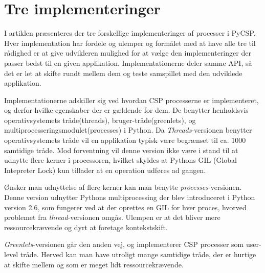 \section{Tre implementeringer}
I artiklen \cite{Friborg2009} præsenteres der tre forskellige implementeringer af processer i PyCSP. Hver implementation har fordele og ulemper og formålet med at have alle tre til rådighed er at give udvikleren mulighed for at vælge den implementeringer der passer bedst til en given applikation. Implementationerne deler samme API, så det er let at skifte rundt mellem dem og teste samspillet med den udviklede applikation. 

Implementationerne adskiller sig ved hvordan CSP processerne er implementeret, og derfor hvilke egenskaber der er gældende for dem. De benytter henholdsvis operativsystemets tråde(threads), bruger-tråde(greenlets), og multiprocesseringsmodulet(processes) i Python. Da \emph{Threads}-versionen benytter operativsystemets tråde vil en applikation typisk være begrænset til ca. 1000 samtidige tråde\cite[3]{Friborg2009}. Mod forventning vil denne version ikke være i stand til at udnytte flere kerner i processoren, hvilket skyldes at Pythons GIL (Global Intepreter Lock) kun tillader at en operation udføres ad gangen. 

Ønsker man udnyttelse af flere kerner kan man benytte \emph{processes}-versionen. Denne version udnytter Pythons multiprocessing der blev introduceret i Python version 2.6, som fungerer ved at der oprettes en GIL for hver proces, hvorved problemet fra \emph{thread}-versionen omgås. Ulempen er at det bliver mere ressourcekrævende og dyrt at foretage kontekstskift. 

\emph{Greenlets}-versionen går den anden vej, og implementerer CSP processer som user-level tråde. Herved kan man have utroligt mange samtidige tråde, der er hurtige at skifte mellem og som er meget lidt ressourcekrævende. 

